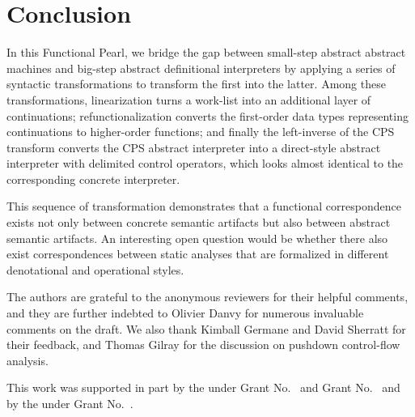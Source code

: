 \documentclass[acmsmall, review]{acmart}\settopmatter{}
\begin{document}
\section{Conclusion}\label{sec:conclusion}


In this Functional Pearl, we bridge the gap between small-step abstract abstract machines
and big-step abstract definitional interpreters by applying a series of syntactic 
transformations to transform the first into the latter. Among these transformations, linearization turns a work-list into an additional
layer of continuations; refunctionalization converts the first-order data types representing
continuations to higher-order functions; and finally the left-inverse of the CPS transform converts
the CPS abstract interpreter into a direct-style abstract interpreter with delimited control operators, which looks almost identical to the corresponding concrete interpreter.

This sequence of transformation demonstrates that a functional correspondence exists 
not only between concrete semantic artifacts but also between abstract semantic artifacts. 
An interesting open question would be whether there also exist correspondences between 
static analyses that are formalized 
in different denotational and operational styles.

\begin{acks}                            %
  The authors are grateful to the anonymous reviewers for their 
  helpful comments, and they are further indebted to Olivier Danvy 
  for numerous invaluable comments on the draft. We also thank
  Kimball Germane and David Sherratt for their feedback, and
  Thomas Gilray for the discussion on pushdown control-flow analysis.

  This work was supported in part by the
   under Grant
  No.~ and Grant
  No.~ and by the
   under Grant
  No.~.  
\end{acks}




\end{document}
